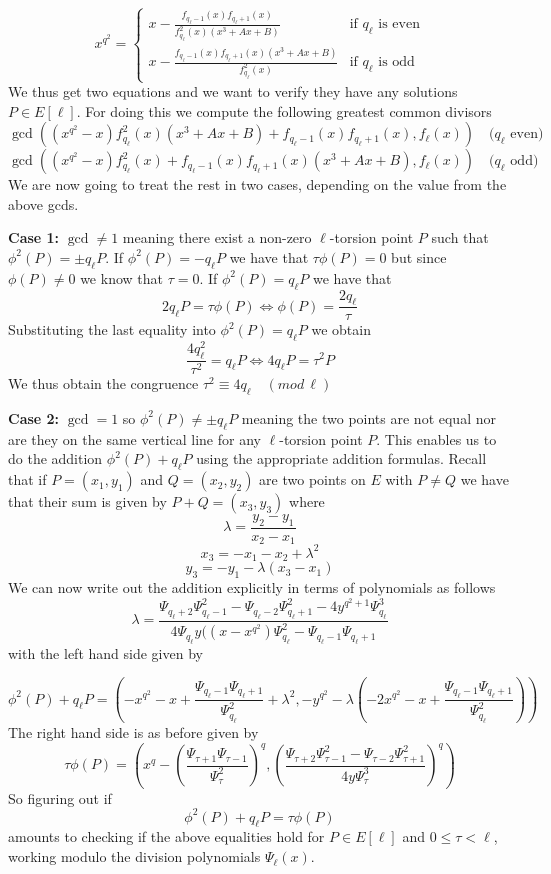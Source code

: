 $$
x^{q^2} = \begin{cases}
           x - \frac{f_{q_\ell-1}(x) f_{q_\ell+1}(x)}{f_{q_\ell}^2(x) (x^3+Ax+B)} & \text{if } q_\ell \text{ is even} \\
	   x - \frac{f_{q_\ell-1}(x) f_{q_\ell+1}(x) (x^3+Ax+B)}{f_{q_\ell}^2(x)} & \text{if } q_\ell \text{ is odd} 
          \end{cases}
$$
We thus get two equations and we want to verify they have any solutions $P \in E[\ell]$. For
doing this we compute the following greatest common divisors
$$ \gcd((x^{q^2} - x)f_{q_\ell}^2(x) (x^3+Ax+B)+f_{q_\ell-1}(x) f_{q_\ell+1}(x), f_\ell(x)) \quad (q_\ell \text{ even)}$$
$$ \gcd((x^{q^2} - x)f_{q_\ell}^2(x)+f_{q_\ell-1}(x) f_{q_\ell+1}(x) (x^3+Ax+B), f_\ell(x)) \quad (q_\ell \text{ odd)}$$
We are now going to treat the rest in two cases, depending on the value from the above gcds.

\textbf{Case 1:} $\gcd \neq 1$ meaning there exist a non-zero $\ell$-torsion point $P$ such that $\phi^2(P) = \pm q_\ell P$.
If $\phi^2 (P) = -q_\ell P$ we have that $\tau \phi(P) = 0$ but since $\phi(P) \neq 0$ we know that $\tau = 0$.
If $\phi^2(P) = q_\ell P$ we have that 
$$ 2 q_\ell P = \tau \phi(P) \Leftrightarrow \phi(P) = \frac{2 q_\ell}{\tau} $$
Substituting the last equality into $\phi^2(P) = q_\ell P$ we obtain
$$ \frac{4 q_\ell^2}{\tau^2} = q_\ell P \Leftrightarrow 4 q_\ell P = \tau^2 P $$
We thus obtain the congruence $\tau^2 \equiv 4q_\ell \quad (mod\, \ell)$

\textbf{Case 2:} $\gcd = 1$ so $\phi^2(P) \neq \pm q_\ell P$ meaning the two points are 
not equal nor are they on the same vertical line for any $\ell$-torsion point $P$. 
This enables us to do the addition $\phi^2(P) + q_\ell P$ using the appropriate addition formulas.
Recall that if $P = (x_1, y_1)$ and $Q = (x_2, y_2)$ are two points on $E$ with
$P \neq Q$ we have that their sum is given by $P+Q = (x_3, y_3)$ where
$$ \lambda = \frac{y_2 - y_1}{x_2 - x_1} $$
$$ x_3 = -x_1 - x_2 + \lambda^2 $$
$$ y_3 = -y_1 -\lambda(x_3 - x_1) $$
We can now write out the addition explicitly in terms of polynomials as follows
$$ \lambda = \frac{\Psi_{q_\ell+2} \Psi_{q_\ell-1}^2 - \Psi_{q_\ell-2}\Psi_{q_\ell+1}^2 - 4y^{q^2+1}\Psi_{q_\ell}^3}
		  {4\Psi_{q_\ell} y ((x-x^{q^2})\Psi_{q_\ell}^2 - \Psi_{q_\ell-1}\Psi_{q_\ell+1}} $$
with the left hand side given by

$$\phi^2 (P) + q_\ell P = \left(-x^{q^2}-x+\frac{\Psi_{q_\ell-1}\Psi_{q_\ell+1}}{\Psi_{q_\ell}^2}+\lambda^2,
		     -y^{q^2}-\lambda\left(-2x^{q^2}-x+\frac{\Psi_{q_\ell-1}\Psi_{q_\ell+1}}{\Psi_{q_\ell}^2}\right)\right)$$
The right hand side is as before given by
$$ \tau\phi(P)=\left(x^q-\left(\frac{\Psi_{\tau+1}\Psi_{\tau-1}}{\Psi_\tau^2}\right)^q,\left(\frac{\Psi_{\tau+2}\Psi_{\tau-1}^2 - \Psi_{\tau-2}\Psi_{\tau+1}^2}{4y\Psi_\tau^3}\right)^q\right) $$
So figuring out if $$\phi^2(P) + q_\ell P = \tau \phi(P) $$ amounts to checking if the above equalities
hold for $P\in E[\ell]$ and $0 \leq \tau < \ell$, working modulo the division polynomials $\Psi_\ell(x)$. 

